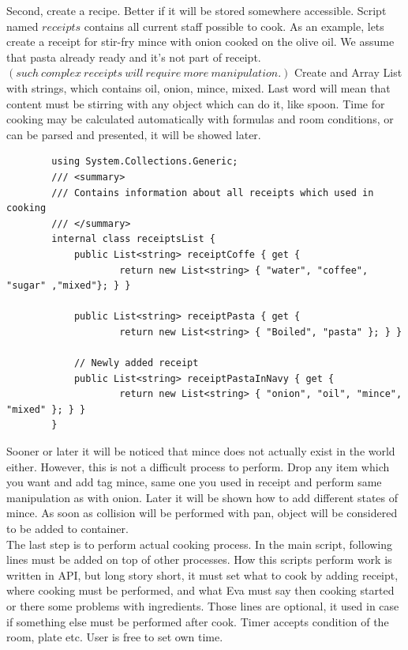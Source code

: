 \documentclass[18pt]{article}
\numberwithin{equation}{section} %
\numberwithin{figure}{section} %
\numberwithin{table}{section} %
\begin{document}
		Second, create a recipe. Better if it will be stored somewhere accessible. Script named $receipts$ contains all current staff possible to cook. As an example, lets create a receipt for stir-fry mince with onion cooked on the olive oil. We assume that pasta already ready and it's not part of receipt. $ \left(such\ complex\ receipts\ will\ require\ more\ manipulation.  \right) $ Create and Array List with strings, which contains oil, onion, mince, mixed. Last word will mean that content must be stirring with any object which can do it, like spoon. Time for cooking may be calculated automatically with formulas and room conditions, or can be parsed and presented, it will be showed later. \\
		
		\lstset{style=sharpc}
		\begin{lstlisting}
		using System.Collections.Generic;
		/// <summary>
		/// Contains information about all receipts which used in cooking
		/// </summary>
		internal class receiptsList {    
			public List<string> receiptCoffe { get { 
					return new List<string> { "water", "coffee", "sugar" ,"mixed"}; } }
					
			public List<string> receiptPasta { get { 
					return new List<string> { "Boiled", "pasta" }; } }
			
			// Newly added receipt		
			public List<string> receiptPastaInNavy { get { 
					return new List<string> { "onion", "oil", "mince", "mixed" }; } }
		}
		\end{lstlisting}
		
		Sooner or later it will be noticed that mince does not actually exist in the world either. However, this is not a difficult process to perform. Drop any item which you want and add tag mince, same one you used in receipt and perform same manipulation as with onion. Later it will be shown how to add different states of mince. As soon as collision will be performed with pan, object will be considered to be added to container. \\
		
		The last step is to perform actual cooking process. In the main script, following lines must be added on top of other processes. How this scripts perform work is written in API, but long story short, it must set what to cook by adding receipt, where cooking must be performed, and what Eva must say then cooking started or there some problems with ingredients. Those lines are optional, it used in case if something else must be performed after cook. Timer accepts condition of the room, plate etc. User is free to set own time.
		
\end{document}
